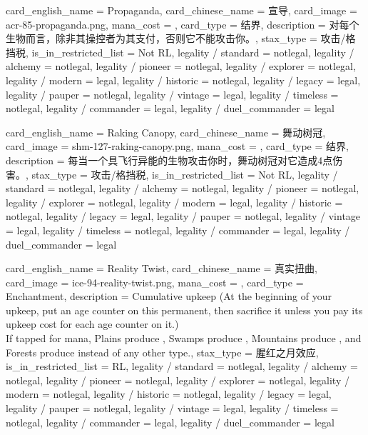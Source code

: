 \documentclass[lang = cn, color = black, 10pt]{AllThatStax}
\begin{document}
\card
{
	card_english_name = {Propaganda},
	card_chinese_name = {宣导},
	card_image = acr-85-propaganda.png,
	mana_cost = ,
	card_type = 结界,
	description = {对每个生物而言，除非其操控者为其支付，否则它不能攻击你。},
	stax_type = 攻击/格挡税,
	is_in_restricted_list = Not RL,
	legality / standard = notlegal,
	legality / alchemy = notlegal,
	legality / pioneer = notlegal,
	legality / explorer = notlegal,
	legality / modern = legal,
	legality / historic = notlegal,
	legality / legacy = legal,
	legality / pauper = notlegal,
	legality / vintage = legal,
	legality / timeless = notlegal,
	legality / commander = legal,
	legality / duel_commander = legal
}

\card
{
	card_english_name = {Raking Canopy},
	card_chinese_name = {舞动树冠},
	card_image = shm-127-raking-canopy.png,
	mana_cost = ,
	card_type = 结界,
	description = {每当一个具飞行异能的生物攻击你时，舞动树冠对它造成4点伤害。},
	stax_type = 攻击/格挡税,
	is_in_restricted_list = Not RL,
	legality / standard = notlegal,
	legality / alchemy = notlegal,
	legality / pioneer = notlegal,
	legality / explorer = notlegal,
	legality / modern = legal,
	legality / historic = notlegal,
	legality / legacy = legal,
	legality / pauper = notlegal,
	legality / vintage = legal,
	legality / timeless = notlegal,
	legality / commander = legal,
	legality / duel_commander = legal
}

\card
{
	card_english_name = {Reality Twist},
	card_chinese_name = {真实扭曲},
	card_image = ice-94-reality-twist.png,
	mana_cost = ,
	card_type = Enchantment,
	description = {Cumulative upkeep  (At the beginning of your upkeep, put an age counter on this permanent, then sacrifice it unless you pay its upkeep cost for each age counter on it.)\\
		If tapped for mana, Plains produce , Swamps produce , Mountains produce , and Forests produce  instead of any other type.},
	stax_type = 腥红之月效应,
	is_in_restricted_list = RL,
	legality / standard = notlegal,
	legality / alchemy = notlegal,
	legality / pioneer = notlegal,
	legality / explorer = notlegal,
	legality / modern = notlegal,
	legality / historic = notlegal,
	legality / legacy = legal,
	legality / pauper = notlegal,
	legality / vintage = legal,
	legality / timeless = notlegal,
	legality / commander = legal,
	legality / duel_commander = legal
}
\end{document}
